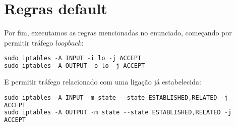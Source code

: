 \documentclass[10pt,a4paper]{report}
\begin{document}
\section*{Regras default}

Por fim, executamos as regras mencionadas no enunciado, começando por permitir tráfego $loopback$:
\begin{lstlisting}[language=Java]
sudo iptables -A INPUT -i lo -j ACCEPT
sudo iptables -A OUTPUT -o lo -j ACCEPT
\end{lstlisting}

E permitir tráfego relacionado com uma ligação já estabelecida:
\begin{lstlisting}[language=Java]
sudo iptables -A INPUT -m state --state ESTABLISHED,RELATED -j
ACCEPT
sudo iptables -A OUTPUT -m state --state ESTABLISHED,RELATED -j
ACCEPT
\end{lstlisting}
\end{document}
